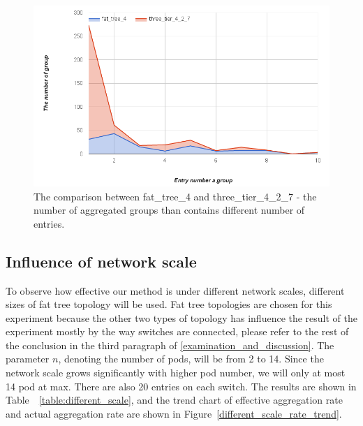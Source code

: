 \begin{figure}[H]
\begin{center} 
\includegraphics[width=1.4\linewidth]{figures/exp_topotype_distribute.png}
\end{center}
\caption{The comparison between fat\_tree\_4 and three\_tier\_4\_2\_7 - the number of aggregated groups than contains different number of entries.}
\label{different_topo_distribute}
\end{figure}

\subsection{Influence of network scale}
To observe how effective our method is under different network scales, different sizes of fat tree topology will be used. Fat tree topologies are chosen for this experiment because the other two types of topology has influence the result of the experiment mostly by the way switches are connected, please refer to the rest of the conclusion in the third paragraph of \ref{examination_and_discussion}. The parameter $n$, denoting the number of pods, will be from 2 to 14. Since the network scale grows significantly with higher pod number, we will only at most 14 pod at max. There are also 20 entries on each switch. The results are shown in Table~~\ref{table:different_scale}, and the trend chart of effective aggregation rate and actual aggregation rate are shown in Figure~\ref{different_scale_rate_trend}.


